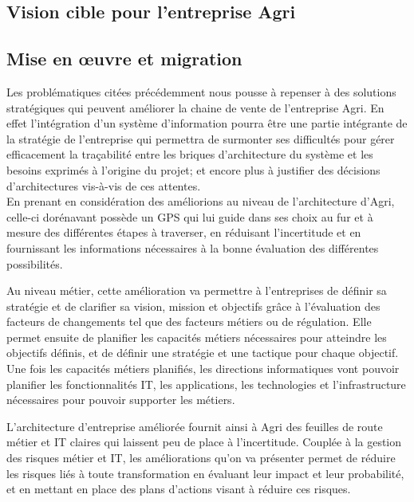 \documentclass[a4paper]{report}
\begin{document}
\begin{doublespace}
\chapter{Vision cible pour l'entreprise Agri}
\fancyhead[L]{\hspace*{5cm}}

\section{Mise en œuvre et migration}

Les problématiques citées précédemment nous pousse à repenser à des
solutions stratégiques qui peuvent améliorer la chaine de vente de
l'entreprise Agri. En effet l'intégration d'un système d'information
pourra être une partie intégrante de la stratégie de l'entreprise qui
permettra de surmonter ses difficultés pour gérer efficacement la
traçabilité entre les briques d'architecture du système et les besoins
exprimés à l'origine du projet; et encore plus à justifier des décisions
d'architectures vis-à-vis de ces attentes. \\
En prenant en considération des améliorions au niveau de l'architecture
d'Agri, celle-ci dorénavant possède un GPS qui lui guide dans ses choix
au fur et à mesure des différentes étapes à traverser, en réduisant
l'incertitude et en fournissant les informations nécessaires à la bonne
évaluation des différentes possibilités.

Au niveau métier, cette amélioration va permettre à l'entreprises de
définir sa stratégie et de clarifier sa vision, mission et objectifs
grâce à l'évaluation des facteurs de changements tel que des facteurs
métiers ou de régulation. Elle permet ensuite de planifier les capacités
métiers nécessaires pour atteindre les objectifs définis, et de définir
une stratégie et une tactique pour chaque objectif. \\
Une fois les capacités métiers planifiés, les directions informatiques
vont pouvoir planifier les fonctionnalités IT, les applications, les
technologies et l'infrastructure nécessaires pour pouvoir supporter les
métiers.

L'architecture d'entreprise améliorée fournit ainsi à Agri des feuilles
de route métier et IT claires qui laissent peu de place à l'incertitude.
Couplée à la gestion des risques métier et IT, les améliorations qu'on
va présenter permet de réduire les risques liés à toute transformation
en évaluant leur impact et leur probabilité, et en mettant en place des
plans d'actions visant à réduire ces risques.


\end{doublespace}
\end{document}
